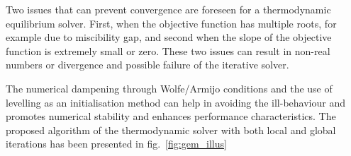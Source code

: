 	Two issues that can prevent convergence are foreseen for a thermodynamic equilibrium solver. First, when the objective function has multiple roots, for example due to miscibility gap, and second when the slope of the objective function is extremely small or zero. These two issues can result in non-real numbers or divergence and possible failure of the iterative solver. 
	
	The numerical dampening through Wolfe/Armijo conditions and the use of levelling as an initialisation method can help in avoiding the ill-behaviour and promotes numerical stability and enhances performance characteristics. The proposed algorithm of the thermodynamic solver with both local and global iterations has been presented in fig.~\ref{fig:gem_illus} 
		
\begin{landscape}
\thispagestyle{empty}
		

\end{landscape}
